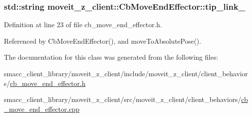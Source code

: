 \subsubsection[{\texorpdfstring{tip\+\_\+link\+\_\+}{tip_link_}}]{\setlength{\rightskip}{0pt plus 5cm}std\+::string moveit\+\_\+z\+\_\+client\+::\+Cb\+Move\+End\+Effector\+::tip\+\_\+link\+\_\+}\hypertarget{classmoveit__z__client_1_1CbMoveEndEffector_abd92e9d3d67bdde11f9e38e0b44a2b8b}{}\label{classmoveit__z__client_1_1CbMoveEndEffector_abd92e9d3d67bdde11f9e38e0b44a2b8b}


Definition at line 23 of file cb\+\_\+move\+\_\+end\+\_\+effector.\+h.



Referenced by Cb\+Move\+End\+Effector(), and move\+To\+Absolute\+Pose().



The documentation for this class was generated from the following files\+:\begin{DoxyCompactItemize}
\item 
smacc\+\_\+client\+\_\+library/moveit\+\_\+z\+\_\+client/include/moveit\+\_\+z\+\_\+client/client\+\_\+behaviors/\hyperlink{cb__move__end__effector_8h}{cb\+\_\+move\+\_\+end\+\_\+effector.\+h}\item 
smacc\+\_\+client\+\_\+library/moveit\+\_\+z\+\_\+client/src/moveit\+\_\+z\+\_\+client/client\+\_\+behaviors/\hyperlink{cb__move__end__effector_8cpp}{cb\+\_\+move\+\_\+end\+\_\+effector.\+cpp}\end{DoxyCompactItemize}

